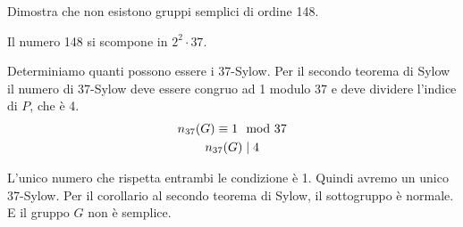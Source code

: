 \begin{esercizio}
    Dimostra che non esistono gruppi semplici di ordine 148.
\end{esercizio}
\begin{soluzione}
    Il numero 148 si scompone in $2^2 \cdot 37$.

    Determiniamo quanti possono essere i 37-Sylow.
    Per il secondo teorema di Sylow il numero di 37-Sylow deve essere congruo ad 1 modulo 37 e deve dividere l'indice
    di $P$, che è 4.
    \begin{gather*}
        n_{37}(G) \equiv 1 \mod 37 \\
        n_{37}(G) \mid 4
    \end{gather*}

    L'unico numero che rispetta entrambi le condizione è 1.
    Quindi avremo un unico 37-Sylow.
    Per il corollario al secondo teorema di Sylow, il sottogruppo è normale.
    E il gruppo $G$ non è semplice.
\end{soluzione}

